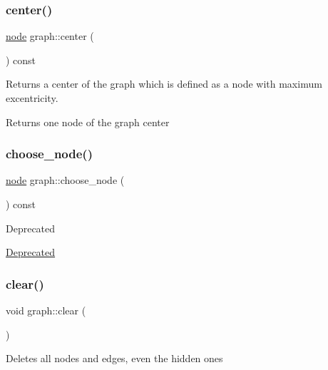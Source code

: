 \subsubsection{\texorpdfstring{center()}{center()}}
{\footnotesize\ttfamily \mbox{\hyperlink{classnode}{node}} graph\+::center (\begin{DoxyParamCaption}{ }\end{DoxyParamCaption}) const}

Returns a center of the graph which is defined as a node with maximum excentricity.

\begin{DoxyReturn}{Returns}
one node of the graph center 
\end{DoxyReturn}
\mbox{\label{classgraph_aec5c11c90a94ebd145f059a541db860e}} 
\subsubsection{\texorpdfstring{choose\+\_\+node()}{choose\_node()}}
{\footnotesize\ttfamily \mbox{\hyperlink{classnode}{node}} graph\+::choose\+\_\+node (\begin{DoxyParamCaption}{ }\end{DoxyParamCaption}) const}

\begin{DoxyRefDesc}{Deprecated}
\item[\mbox{\hyperlink{deprecated__deprecated000005}{Deprecated}}]\end{DoxyRefDesc}
\mbox{\label{classgraph_a9ff5d6af3653e79f87b836701453f55a}} 
\subsubsection{\texorpdfstring{clear()}{clear()}}
{\footnotesize\ttfamily void graph\+::clear (\begin{DoxyParamCaption}{ }\end{DoxyParamCaption})}

Deletes all nodes and edges, even the hidden ones \mbox{\label{classgraph_aae52be443c5aef001b5f6758855f15ad}} 
